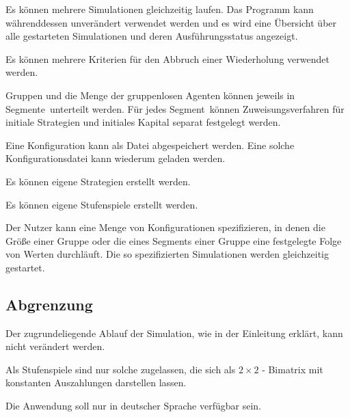 \documentclass[parskip=full,11pt]{scrartcl}
\def\segment{Segment}
\def\segments{Segmente}
\begin{document}
Es können mehrere Simulationen gleichzeitig laufen. Das Programm kann währenddessen unverändert verwendet werden und es wird eine Übersicht über alle gestarteten Simulationen und deren Ausführungsstatus angezeigt.

Es können mehrere Kriterien für den Abbruch einer Wiederholung verwendet werden.

Gruppen und die Menge der gruppenlosen Agenten können jeweils in \segments\ unterteilt werden. Für jedes \segment\ können Zuweisungsverfahren für initiale Strategien und initiales Kapital separat festgelegt werden.

Eine Konfiguration kann als Datei abgespeichert werden. Eine solche Konfigurationsdatei kann wiederum geladen werden.

Es können eigene Strategien erstellt werden.

Es können eigene Stufenspiele erstellt werden.

Der Nutzer kann eine Menge von Konfigurationen spezifizieren, in denen die Größe einer Gruppe oder die eines \segment s einer Gruppe eine festgelegte Folge von Werten durchläuft. Die so spezifizierten Simulationen werden gleichzeitig gestartet.

\subsection{Abgrenzung}

Der zugrundeliegende Ablauf der Simulation, wie in der Einleitung erklärt, kann nicht verändert werden.

Als Stufenspiele sind nur solche zugelassen, die sich als \(2 \times 2\) - Bimatrix mit konstanten Auszahlungen darstellen lassen.

Die Anwendung soll nur in deutscher Sprache verfügbar sein.

\pagebreak

\end{document}

